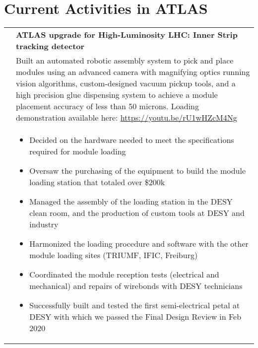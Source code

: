 \documentclass[a4paper,10pt]{article}
\begin{document}
\vspace{3mm}

\section{Current Activities in ATLAS}
\begin{tabularx}{\textwidth}{>{\centering\arraybackslash}X p{} }
{\bf Upgrade} &   \textbf{ATLAS upgrade for High-Luminosity LHC: Inner Strip tracking detector} \\
  & Built an automated robotic assembly system to pick and place modules using an advanced camera with magnifying optics running vision algorithms, custom-designed vacuum pickup tools, and a high precision glue dispensing system to achieve a module placement accuracy of less than 50 microns. Loading demonstration available here: \href{https://youtu.be/rU1wHZcM4Ng}{https://youtu.be/rU1wHZcM4Ng} \\
      & \begin{itemize}
      \item Decided on the hardware needed to meet the specifications required for module loading
      \item Oversaw the purchasing of the equipment to build the module loading station that totaled over \$200k %
         \item Managed the assembly of the loading station in the DESY clean room, and the production of custom tools at DESY and industry
         \item Harmonized the loading procedure and software with the other module loading sites (TRIUMF, IFIC, Freiburg)
         \item Coordinated the module reception tests (electrical and mechanical) and repairs of wirebonds with DESY technicians
         \item Successfully built and tested the first semi-electrical petal at DESY with which we passed the Final Design Review in Feb 2020
       \end{itemize} \\[-1.5ex]


\end{tabularx}
\end{document}
